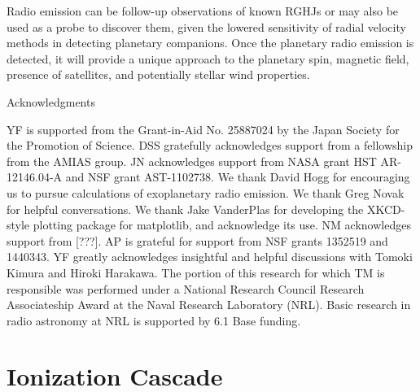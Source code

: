 \documentclass[iop,numberedappendix,apj]{emulateapj}
\begin{document}
Radio emission can be follow-up observations of known RGHJs or may also be used as a probe to discover them, given the lowered sensitivity of  radial velocity methods in detecting planetary companions. 
Once the planetary radio emission is detected, it will provide a unique approach to the planetary spin, magnetic field, presence of satellites, and potentially stellar wind properties.


\vspace{0.5in}

\acknowledgements

{\sc Acknowledgments}

YF is supported from the Grant-in-Aid No. 25887024 by the Japan Society for the Promotion of Science.
DSS gratefully acknowledges support from a fellowship from the AMIAS group. JN acknowledges support from NASA grant HST AR-12146.04-A and NSF grant AST-1102738.
We thank David Hogg for encouraging us to pursue calculations of exoplanetary radio emission.
We thank Greg Novak for helpful conversations.
We thank Jake VanderPlas for developing the XKCD-style plotting package for matplotlib, and acknowledge its use.
NM acknowledges support from [???]. 
AP is grateful for support from NSF grants 1352519 and 1440343.
YF greatly acknowledges insightful and helpful discussions with Tomoki Kimura and Hiroki Harakawa. 
The portion of this research for which TM is responsible was performed under a National Research 
Council Research Associateship Award at the Naval Research Laboratory (NRL).
Basic research in radio astronomy at NRL is supported by 6.1 Base funding.





\newpage

\appendix



\section{Ionization Cascade}
\label{sec:AppendixA}
\end{document}
